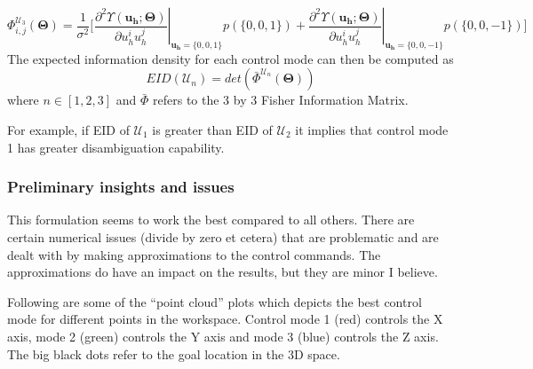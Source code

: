 \documentclass[]{article}
\begin{document}
\begin{equation*}
\Phi^{\mathcal{U}_3}_{i,j}(\boldsymbol{\Theta}) = \frac{1}{\sigma^2}\Big[^{}\left.\frac{\partial^2\Upsilon(\boldsymbol{u_h}; \boldsymbol{\Theta})}{\partial u_h^iu_h^j}\right\vert_{\boldsymbol{u_h} = \{0,0,1\}}p(\{0,0,1\}) + \left.\frac{\partial^2\Upsilon(\boldsymbol{u_h}; \boldsymbol{\Theta})}{\partial u_h^iu_h^j}\right\vert_{\boldsymbol{u_h} = \{0,0,-1\}}p(\{0,0,-1\})\Big]
\end{equation*}
The expected information density for each control mode can then be computed as 
\begin{equation*}
	EID(\mathcal{U}_n) = det(\bar{\Phi}^{\mathcal{U}_n}(\boldsymbol{\Theta}))
\end{equation*}
where $n \in [1,2,3]$ and $\bar{\Phi}$ refers to the 3 by 3 Fisher Information Matrix. 

For example, if EID of $\mathcal{U}_1$ is greater than EID of $\mathcal{U}_2$ it implies that control mode 1 has greater disambiguation capability. 

\subsubsection*{Preliminary insights and issues}

This formulation seems to work the best compared to all others. There are certain numerical issues (divide by zero et cetera) that are problematic and are dealt with by making approximations to the control commands. The approximations do have an impact on the results, but they are minor I believe.  

Following are some of the ``point cloud'' plots which depicts the best control mode for different points in the workspace. Control mode 1 (red) controls the X axis, mode 2 (green) controls the Y axis and mode 3 (blue) controls the Z axis. The big black dots refer to the goal location in the 3D space. 
\end{document}

